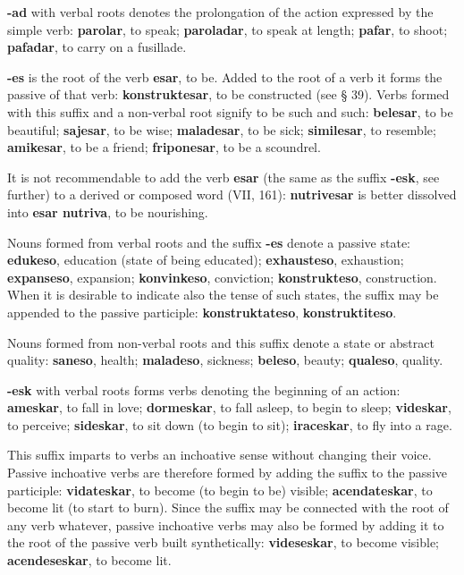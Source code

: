 \textbf{-ad} with verbal roots denotes the prolongation of the action expressed by the simple verb: \textbf{parolar}, to speak; \textbf{paroladar}, to speak at length; \textbf{pafar}, to shoot; \textbf{pafadar}, to carry on a fusillade. 

\textbf{-es} is the root of the verb \textbf{esar}, to be. Added to the root of a verb it forms the passive of that verb: \textbf{konstruktesar}, to be constructed (see § 39). Verbs formed with this suffix and a non-verbal root signify to be such and such: \textbf{belesar}, to be beautiful; \textbf{sajesar}, to be wise; \textbf{maladesar}, to be sick; \textbf{similesar}, to resemble; \textbf{amikesar}, to be a friend; \textbf{friponesar}, to be a scoundrel. 

It is not recommendable to add the verb \textbf{esar} (the same as the suffix \textbf{-esk}, see further) to a derived or composed word (VII, 161): \textbf{nutrivesar} is better dissolved into \textbf{esar nutriva}, to be nourishing. 

Nouns formed from verbal roots and the suffix \textbf{-es} denote a passive state: \textbf{edukeso}, education (state of being educated); \textbf{exhausteso}, exhaustion; \textbf{expanseso}, expansion; \textbf{konvinkeso}, conviction; \textbf{konstrukteso}, construction. When it is desirable to indicate also the tense of such states, the suffix may be appended to the passive participle: \textbf{konstruktateso}, \textbf{konstruktiteso}. 

Nouns formed from non-verbal roots and this suffix denote a state or abstract quality: \textbf{saneso}, health; \textbf{maladeso}, sickness; \textbf{beleso}, beauty; \textbf{qualeso}, quality. 

\textbf{-esk} with verbal roots forms verbs denoting the beginning of an action: \textbf{ameskar}, to fall in love; \textbf{dormeskar}, to fall asleep, to begin to sleep; \textbf{videskar}, to perceive; \textbf{sideskar}, to sit down (to begin to sit); \textbf{iraceskar}, to fly into a rage. 

This suffix imparts to verbs an inchoative sense without changing their voice. Passive inchoative verbs are therefore formed by adding the suffix to the passive participle: \textbf{vidateskar}, to become (to begin to be) visible; \textbf{acendateskar}, to become lit (to start to burn). Since the suffix may be connected with the root of any verb whatever, passive inchoative verbs may also be formed by adding it to the root of the passive verb built synthetically: \textbf{videseskar}, to become visible; \textbf{acendeseskar}, to become lit. 

